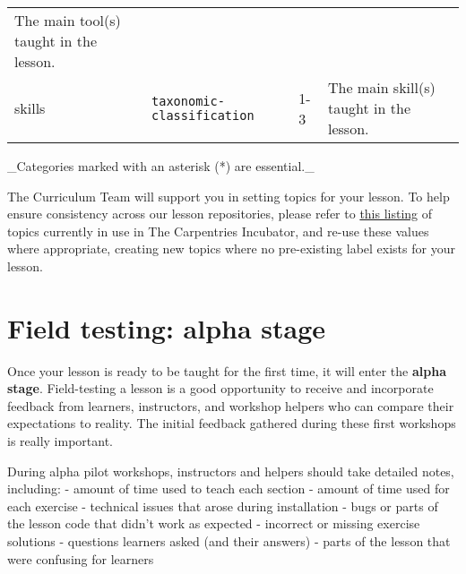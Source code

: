 \documentclass[
]{book}
\begin{document}
\begin{longtable}[]{@{}llll@{}}
\begin{minipage}[t]{0.16\columnwidth}
The main tool(s) taught in the lesson.\strut
\end{minipage}\tabularnewline
\begin{minipage}[t]{0.26\columnwidth}\raggedright
skills\strut
\end{minipage} & \begin{minipage}[t]{0.26\columnwidth}\raggedright
\texttt{taxonomic-classification}\strut
\end{minipage} & \begin{minipage}[t]{0.21\columnwidth}\raggedright
1-3\strut
\end{minipage} & \begin{minipage}[t]{0.16\columnwidth}\raggedright
The main skill(s) taught in the lesson.\strut
\end{minipage}\tabularnewline
\bottomrule
\end{longtable}

\_Categories marked with an asterisk (*) are essential.\_

The Curriculum Team will support you in setting topics for your lesson.
To help ensure consistency across our lesson repositories,
please refer to \href{https://docs.google.com/spreadsheets/d/1KkmBtCu4PaNb5nzJAD82UHcfHQlaPY84qPVxw8WO8es/edit?usp=sharing}{this listing} of topics currently
in use in The Carpentries Incubator,
and re-use these values where appropriate,
creating new topics where no pre-existing label exists for your lesson.

\hypertarget{field-testing-alpha-stage}{%
\section{Field testing: alpha stage}\label{field-testing-alpha-stage}}

Once your lesson is ready to be taught for the first
time, it will enter the \textbf{alpha stage}. Field-testing a
lesson is a good opportunity to receive and incorporate
feedback from learners, instructors, and workshop
helpers who can compare their expectations to
reality. The initial feedback gathered during these first
workshops is really important.

During alpha pilot workshops, instructors and helpers should take detailed notes, including:
- amount of time used to teach each section
- amount of time used for each exercise
- technical issues that arose during installation
- bugs or parts of the lesson code that didn't work as expected
- incorrect or missing exercise solutions
- questions learners asked (and their answers)
- parts of the lesson that were confusing for learners
\end{document}
